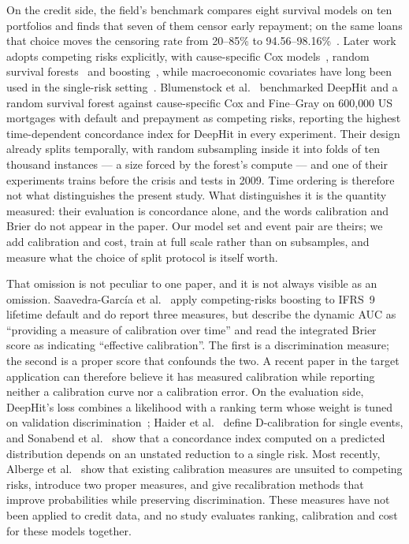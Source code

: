 \documentclass[11pt,journal]{IEEEtran}
\begin{document}
On the credit side, the field's benchmark compares eight survival models on ten
portfolios and finds that seven of them censor early repayment; on the same
loans that choice moves the censoring rate from 20--85\% to
94.56--98.16\%~\cite{DBLP:journals/jors/DirickCB17}. Later work adopts competing
risks explicitly, with cause-specific Cox models~\cite{DBLP:journals/jors/ThackhamM22},
random survival forests~\cite{DBLP:journals/jors/FrydmanM22} and boosting~\cite{DBLP:journals/eswa/SaavedraGGK24},
while macroeconomic covariates have long been used in the single-risk
setting~\cite{DBLP:journals/jors/BellottiC09}. Blumenstock et al.~\cite{DBLP:journals/jors/BlumenstockLS22}
benchmarked DeepHit and a random survival forest against cause-specific Cox and
Fine--Gray on 600{,}000 US mortgages with default and prepayment as competing
risks, reporting the highest time-dependent concordance index for DeepHit in
every experiment. Their design already splits temporally, with random
subsampling inside it into folds of ten thousand instances --- a size forced by
the forest's compute --- and one of their experiments trains before the crisis
and tests in 2009. Time ordering is therefore not what distinguishes the present
study. What distinguishes it is the quantity measured: their evaluation is
concordance alone, and the words calibration and Brier do not appear in the
paper. Our model set and event pair are theirs; we add calibration and cost,
train at full scale rather than on subsamples, and measure what the choice of
split protocol is itself worth.

That omission is not peculiar to one paper, and it is not always visible as an
omission. Saavedra-Garc\'ia et al.~\cite{DBLP:journals/eswa/SaavedraGGK24} apply
competing-risks boosting to IFRS~9 lifetime default and do report three
measures, but describe the dynamic AUC as ``providing a measure of calibration
over time'' and read the integrated Brier score as indicating ``effective
calibration''. The first is a discrimination measure; the second is a proper
score that confounds the two. A recent paper in the target application can
therefore believe it has measured calibration while reporting neither a
calibration curve nor a calibration error. On the
evaluation side, DeepHit's loss combines a likelihood with a ranking term whose
weight is tuned on validation discrimination~\cite{DBLP:conf/aaai/LeeZYS18};
Haider et al.~\cite{DBLP:journals/jmlr/HaiderHDG20} define D-calibration for single events,
and Sonabend et al.~\cite{DBLP:journals/bioinformatics/SonabendBV22} show that a concordance
index computed on a predicted distribution depends on an unstated reduction to a
single risk. Most recently, Alberge et al.~\cite{alberge2026calibration} show that existing
calibration measures are unsuited to competing risks, introduce two proper
measures, and give recalibration methods that improve probabilities while
preserving discrimination. These measures have not been applied to credit data,
and no study evaluates ranking, calibration and cost for these models together.
\end{document}
